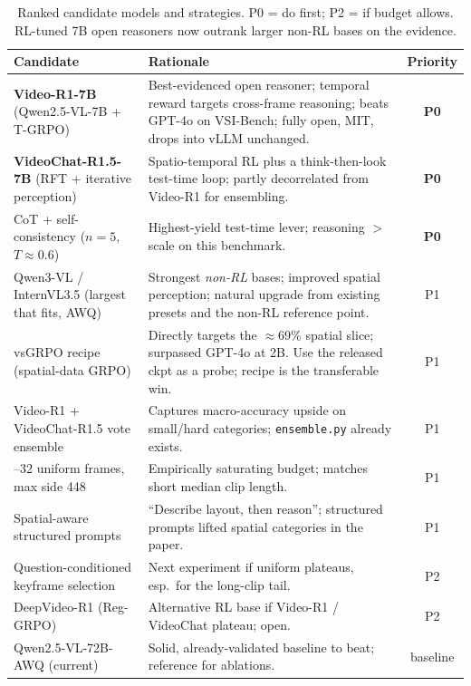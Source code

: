 \documentclass[11pt]{article}
\newcommand{\best}[1]{\textbf{#1}}
\begin{document}
\begin{table}[ht]
\centering
\small
\renewcommand{\arraystretch}{1.25}
\begin{tabular}{>{\raggedright\arraybackslash}p{3.5cm} >{\raggedright\arraybackslash}p{6.0cm} c}
\toprule
\textbf{Candidate} & \textbf{Rationale} & \textbf{Priority} \\
\midrule
\best{Video-R1-7B} (Qwen2.5-VL-7B + T-GRPO) &
Best-evidenced open reasoner; temporal reward targets cross-frame reasoning;
beats GPT-4o on VSI-Bench; fully open, MIT, drops into vLLM unchanged. & \best{P0} \\
\best{VideoChat-R1.5-7B} (RFT + iterative perception) &
Spatio-temporal RL plus a think-then-look test-time loop; partly decorrelated
from Video-R1 for ensembling. & \best{P0} \\
CoT + self-consistency ($n{=}5$, $T{\approx}0.6$) &
Highest-yield test-time lever; reasoning $>$ scale on this benchmark. & \best{P0} \\
Qwen3-VL / InternVL3.5 (largest that fits, AWQ) &
Strongest \emph{non-RL} bases; improved spatial perception; natural upgrade from
existing presets and the non-RL reference point. & P1 \\
vsGRPO recipe (spatial-data GRPO) &
Directly targets the $\approx$69\% spatial slice; surpassed GPT-4o at 2B. Use the
released ckpt as a probe; recipe is the transferable win. & P1 \\
Video-R1 + VideoChat-R1.5 vote ensemble &
Captures macro-accuracy upside on small/hard categories; \texttt{ensemble.py}
already exists. & P1 \\
16--32 uniform frames, max side 448 &
Empirically saturating budget; matches short median clip length. & P1 \\
Spatial-aware structured prompts &
``Describe layout, then reason''; structured prompts lifted spatial categories in
the paper. & P1 \\
Question-conditioned keyframe selection &
Next experiment if uniform plateaus, esp.\ for the long-clip tail. & P2 \\
DeepVideo-R1 (Reg-GRPO) &
Alternative RL base if Video-R1 / VideoChat plateau; open. & P2 \\
Qwen2.5-VL-72B-AWQ (current) &
Solid, already-validated baseline to beat; reference for ablations. & baseline \\
\bottomrule
\end{tabular}
\caption{Ranked candidate models and strategies. P0 = do first; P2 = if budget
allows. RL-tuned 7B open reasoners now outrank larger non-RL bases on the evidence.}
\label{tab:candidates}
\end{table}
\end{document}
